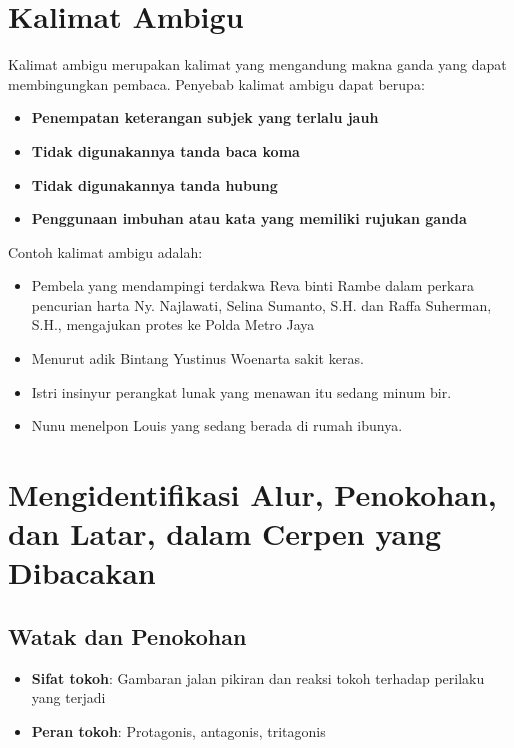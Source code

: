 \documentclass[12pt,a4paper]{article}
\begin{document}
\section{Kalimat Ambigu}
Kalimat ambigu merupakan kalimat yang mengandung makna ganda yang dapat membingungkan pembaca. Penyebab kalimat ambigu dapat berupa:
\begin{itemize}
    \item \textbf {Penempatan keterangan subjek yang terlalu jauh}
    \item \textbf {Tidak digunakannya tanda baca koma}
    \item \textbf {Tidak digunakannya tanda hubung}
    \item \textbf {Penggunaan imbuhan atau kata yang memiliki rujukan ganda}
\end{itemize}
Contoh kalimat ambigu adalah:
\begin{itemize}
    \item Pembela yang mendampingi terdakwa Reva binti Rambe dalam perkara pencurian harta Ny. Najlawati, Selina Sumanto, S.H. dan Raffa Suherman, S.H., mengajukan protes ke Polda Metro Jaya
    \item Menurut adik Bintang Yustinus Woenarta sakit keras.
    \item Istri insinyur perangkat lunak yang menawan itu sedang minum bir.
    \item Nunu menelpon Louis yang sedang berada di rumah ibunya.
\end{itemize}

\newpage
\section{Mengidentifikasi Alur, Penokohan, dan Latar, dalam Cerpen yang Dibacakan}
\subsection{Watak dan Penokohan}
\begin{itemize}
    \item \textbf{Sifat tokoh}: Gambaran jalan pikiran dan reaksi tokoh terhadap perilaku yang terjadi
    \item \textbf{Peran tokoh}: Protagonis, antagonis, tritagonis
\end{itemize}
\end{document}
